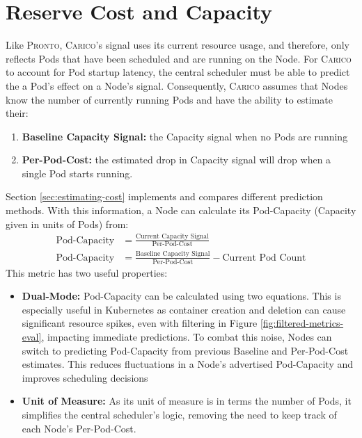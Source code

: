\section{Reserve Cost and Capacity}
\label{sec:spazio-cost-capacity}
Like \textsc{Pronto}, \textsc{Carico}'s signal uses its current resource usage, and therefore, only
reflects Pods that have been scheduled and are running on the Node. For
\textsc{Carico} to account for Pod startup latency, the central scheduler must be able
to predict the a Pod's effect on a Node's signal. Consequently, \textsc{Carico}
assumes that Nodes know the number of currently running Pods and have the
ability to estimate their:
\begin{enumerate}
    \item \textbf{Baseline Capacity Signal:} the Capacity signal when no Pods
        are running
    \item \textbf{Per-Pod-Cost:} the estimated drop in Capacity signal will drop
        when a single Pod starts running.
\end{enumerate}
Section \ref{sec:estimating-cost} implements and compares different prediction
methods. With this information, a Node can calculate its Pod-Capacity (Capacity
given in units of Pods) from:
\begin{align}
    \text{Pod-Capacity} &= \frac{\text{Current Capacity Signal}}{\text{Per-Pod-Cost}} \\
    \text{Pod-Capacity} &= \frac{\text{Baseline Capacity Signal}}{\text{Per-Pod-Cost}}
    - \text{Current Pod Count}
\end{align}
This metric has two useful properties:
\begin{itemize}
    \item \textbf{Dual-Mode:} Pod-Capacity can be calculated
        using two equations. This is especially useful in Kubernetes as
        container creation and deletion can cause significant resource spikes,
        even with filtering in Figure \ref{fig:filtered-metrics-eval}, impacting
        immediate predictions.
        To combat this noise, Nodes can switch to predicting Pod-Capacity from
        previous Baseline and Per-Pod-Cost estimates. This reduces fluctuations
        in a Node's advertised Pod-Capacity and improves scheduling decisions
    \item \textbf{Unit of Measure:} As its unit of measure is in terms
        the number of Pods, it simplifies the central scheduler's logic,
        removing the need to keep track of each Node's Per-Pod-Cost.
\end{itemize}

